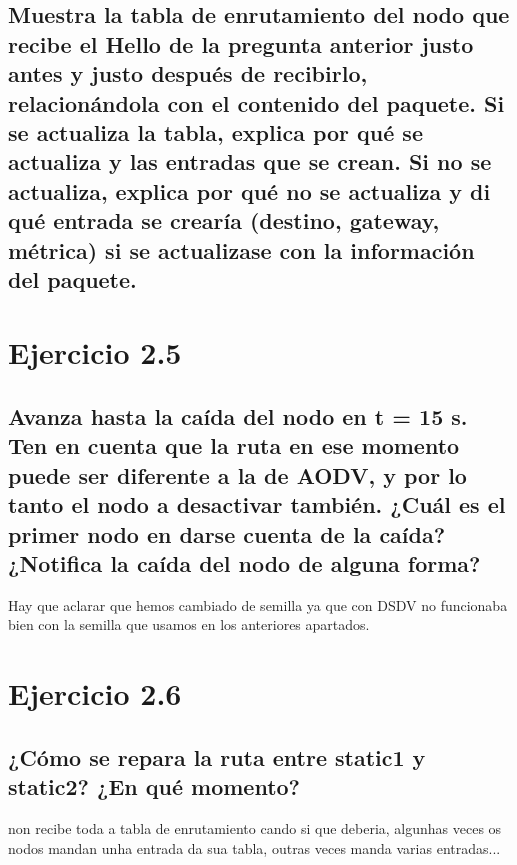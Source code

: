 \subsection{Muestra la tabla de enrutamiento del nodo que recibe el Hello de la pregunta anterior justo antes y justo
después de recibirlo, relacionándola con el contenido del paquete. Si se actualiza la tabla, explica por qué se
actualiza y las entradas que se crean. Si no se actualiza, explica por qué no se actualiza y di qué entrada se
crearía (destino, gateway, métrica) si se actualizase con la información del paquete.}

\section{Ejercicio 2.5}

\subsection{Avanza hasta la caída del nodo en t = 15 s. Ten en cuenta que la ruta en ese momento puede ser diferente a
la de AODV, y por lo tanto el nodo a desactivar también. ¿Cuál es el primer nodo en darse cuenta de la caída?
¿Notifica la caída del nodo de alguna forma?}

Hay que aclarar que hemos cambiado de semilla ya que con DSDV no funcionaba bien con la semilla que usamos en los anteriores apartados.



\section{Ejercicio 2.6}

\subsection{¿Cómo se repara la ruta entre static1 y static2? ¿En qué momento?}



non recibe toda a tabla de enrutamiento cando si que deberia, algunhas veces os nodos mandan unha entrada da sua tabla, outras veces manda varias entradas...